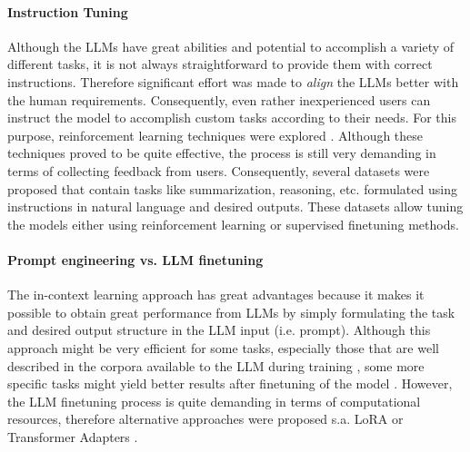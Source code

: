 \paragraph{Instruction Tuning}
Although the LLMs have great abilities and potential to accomplish a variety of different tasks, it is not always straightforward to provide them with correct instructions.
Therefore significant effort was made to \emph{align} the LLMs better with the human requirements.
Consequently, even rather inexperienced users can instruct the model to accomplish custom tasks according to their needs.
For this purpose, reinforcement learning techniques were explored \cite{ziegler2019fine,ouyang2022training}.
Although these techniques proved to be quite effective, the process is still very demanding in terms of collecting feedback from users.
Consequently, several datasets were proposed \cite{supernaturalinstructions,black2022gpt} that contain tasks like summarization, reasoning, etc. formulated using instructions in natural language and desired outputs.
These datasets allow tuning the models either using reinforcement learning or supervised finetuning methods.

\paragraph{Prompt engineering vs. LLM finetuning}
The in-context learning approach has great advantages because it makes it possible to obtain great performance from LLMs by simply formulating the task and desired output structure in the LLM input (i.e. prompt).
Although this approach might be very efficient for some tasks, especially those that are well described in the corpora available to the LLM during training \cite{wei2022emergent}, some more specific tasks might yield better results after finetuning of the model \cite{tu-etal-2022-prompt}.
However, the LLM finetuning process is quite demanding in terms of computational resources, therefore alternative approaches were proposed s.a. LoRA \cite{hu2021lora} or Transformer Adapters \cite{pfeiffer2020AdapterHub}.

